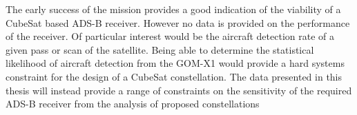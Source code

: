 The early success of the mission provides a good indication of the viability of a CubeSat based ADS-B receiver. However no data is provided on the performance of the receiver. Of particular interest would be the aircraft detection rate of a given pass or scan of the satellite. Being able to determine the statistical likelihood of aircraft detection from the GOM-X1 would provide a hard systems constraint for the design of a CubeSat constellation. The data presented in this thesis will instead provide a range of constraints on the sensitivity of the required ADS-B receiver from the analysis of proposed constellations  

